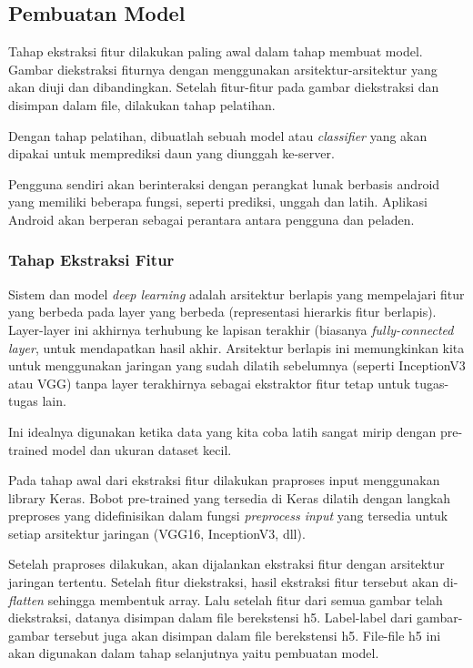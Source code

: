 \subsection{Pembuatan Model}
\par Tahap ekstraksi fitur dilakukan paling awal dalam tahap membuat model. Gambar diekstraksi fiturnya dengan menggunakan arsitektur-arsitektur yang akan diuji dan dibandingkan. Setelah fitur-fitur pada gambar diekstraksi dan disimpan dalam file, dilakukan tahap pelatihan. 
\par Dengan tahap pelatihan, dibuatlah sebuah model atau \textit{classifier} yang akan dipakai untuk memprediksi daun yang diunggah ke-server.
\par Pengguna sendiri akan berinteraksi dengan perangkat lunak berbasis android yang memiliki beberapa fungsi, seperti prediksi, unggah dan latih. Aplikasi Android akan berperan sebagai perantara antara pengguna dan peladen.

\subsubsection{Tahap Ekstraksi Fitur}
\par Sistem dan model \textit{deep learning} adalah arsitektur berlapis yang mempelajari fitur yang berbeda pada layer yang berbeda (representasi hierarkis fitur berlapis). Layer-layer ini akhirnya terhubung ke lapisan terakhir (biasanya \textit{fully-connected layer}, untuk mendapatkan hasil akhir. Arsitektur berlapis ini memungkinkan kita untuk menggunakan jaringan yang sudah dilatih sebelumnya (seperti InceptionV3 atau VGG) tanpa layer terakhirnya sebagai ekstraktor fitur tetap untuk tugas-tugas lain.
\par Ini idealnya digunakan ketika data yang kita coba latih sangat mirip dengan pre-trained model dan ukuran dataset kecil.
\par Pada tahap awal dari ekstraksi fitur dilakukan praproses input menggunakan library Keras. Bobot pre-trained yang tersedia di Keras dilatih dengan langkah preproses yang didefinisikan dalam fungsi \textit{preprocess input} yang tersedia untuk setiap arsitektur jaringan (VGG16, InceptionV3, dll).
\par Setelah praproses dilakukan, akan dijalankan ekstraksi fitur dengan arsitektur jaringan tertentu. Setelah fitur diekstraksi, hasil ekstraksi fitur tersebut  akan di-\textit{flatten} sehingga membentuk array. Lalu setelah fitur dari semua gambar telah diekstraksi, datanya disimpan dalam file berekstensi h5. Label-label dari gambar-gambar tersebut juga akan disimpan dalam file berekstensi h5. File-file h5 ini akan digunakan dalam tahap selanjutnya yaitu pembuatan model.

